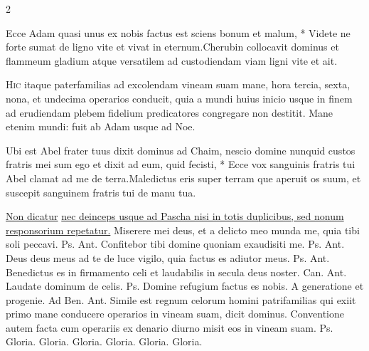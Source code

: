 \begin{multicols*}{2}
\begin{responsory}
{Ecce Adam quasi unus ex nobis factus est sciens bonum et malum, * Videte ne forte sumat de ligno vite et vivat in eternum.}{Cherubin collocavit dominus et flammeum gladium atque versatilem ad custodiendam viam ligni vite et ait.}
\end{responsory}%
\lettrine[lines=2]{\zallmancaps \color{Red} H}{ic} itaque paterfamilias ad excolendam vineam suam mane, hora tercia, sexta, nona, et undecima operarios conducit, quia a mundi huius inicio usque in finem ad erudiendam plebem fidelium predicatores congregare non destitit. Mane etenim mundi: fuit ab Adam usque ad Noe.
\begin{responsory-doxology}
{Ubi est Abel frater tuus dixit dominus ad Chaim, nescio domine nunquid custos fratris mei sum ego et dixit ad eum, quid fecisti, * Ecce vox sanguinis fratris tui Abel clamat ad me de terra.}{Maledictus eris super terram que aperuit os suum, et suscepit sanguinem fratris tui de manu tua.}
\end{responsory-doxology}%
\newline \ul{Non dicatur}  \ul{nec deinceps usque ad Pascha nisi in totis duplicibus, sed nonum responsorium repetatur.}%
 Miserere mei deus, et a delicto meo munda me, quia tibi soli peccavi. {\color{Red} Ps.}  {\color{Red} Ant.} Confitebor tibi domine quoniam exaudisiti me. {\color{Red} Ps.}  {\color{Red} Ant.} Deus deus meus ad te de luce vigilo, quia factus es adiutor meus. {\color{Red} Ps.}  {\color{Red} Ant.} Benedictus es in firmamento celi et laudabilis in secula deus noster. {\color{Red} Can.}  {\color{Red} Ant.} Laudate dominum de celis. {\color{Red} Ps.}  \V Domine refugium factus es nobis. \R A generatione et progenie. {\color{Red} Ad Ben. Ant.} Simile est regnum celorum homini patrifamilias qui exiit primo mane conducere operarios in vineam suam, dicit dominus.
 Conventione autem facta cum operariis ex denario diurno misit eos in vineam suam. {\color{Red} Ps.}   {\color{Red} Gloria.}   {\color{Red} Gloria.}   {\color{Red} Gloria.}   {\color{Red} Gloria.}  {\color{Red} Gloria.}  {\color{Red} Gloria.}

\end{multicols*}
